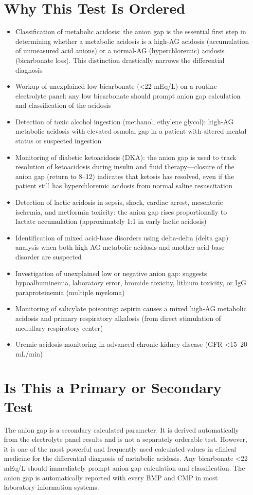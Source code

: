 \section*{Why This Test Is Ordered}
\begin{itemize}
  \item Classification of metabolic acidosis: the anion gap is the essential first step in determining whether a metabolic acidosis is a high-AG acidosis (accumulation of unmeasured acid anions) or a normal-AG (hyperchloremic) acidosis (bicarbonate loss). This distinction drastically narrows the differential diagnosis
  \item Workup of unexplained low bicarbonate (<22 mEq/L) on a routine electrolyte panel: any low bicarbonate should prompt anion gap calculation and classification of the acidosis
  \item Detection of toxic alcohol ingestion (methanol, ethylene glycol): high-AG metabolic acidosis with elevated osmolal gap in a patient with altered mental status or suspected ingestion
  \item Monitoring of diabetic ketoacidosis (DKA): the anion gap is used to track resolution of ketoacidosis during insulin and fluid therapy---closure of the anion gap (return to 8--12) indicates that ketosis has resolved, even if the patient still has hyperchloremic acidosis from normal saline resuscitation
  \item Detection of lactic acidosis in sepsis, shock, cardiac arrest, mesenteric ischemia, and metformin toxicity: the anion gap rises proportionally to lactate accumulation (approximately 1:1 in early lactic acidosis)
  \item Identification of mixed acid-base disorders using delta-delta (delta gap) analysis when both high-AG metabolic acidosis and another acid-base disorder are suspected
  \item Investigation of unexplained low or negative anion gap: suggests hypoalbuminemia, laboratory error, bromide toxicity, lithium toxicity, or IgG paraproteinemia (multiple myeloma)
  \item Monitoring of salicylate poisoning: aspirin causes a mixed high-AG metabolic acidosis and primary respiratory alkalosis (from direct stimulation of medullary respiratory center)
  \item Uremic acidosis monitoring in advanced chronic kidney disease (GFR <15--20 mL/min)
\end{itemize}

\section*{Is This a Primary or Secondary Test}
The anion gap is a secondary calculated parameter. It is derived automatically from the electrolyte panel results and is not a separately orderable test. However, it is one of the most powerful and frequently used calculated values in clinical medicine for the differential diagnosis of metabolic acidosis. Any bicarbonate <22 mEq/L should immediately prompt anion gap calculation and classification. The anion gap is automatically reported with every BMP and CMP in most laboratory information systems.

